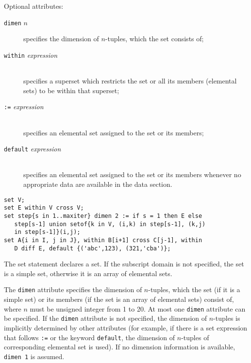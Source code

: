 \documentclass[10pt]{article}
\begin{document}
\noindent Optional attributes:

\begin{description}
\item[{\tt dimen} $n$\hspace*{19pt}] specifies the dimension of
$n$-tuples, which the set consists of;
\item[{\tt within} {\it expression}]\hspace*{0pt}\\
specifies a superset which restricts the set or all its members
(elemental sets) to be within that superset;
\item[{\tt:=} {\it expression}]\hspace*{0pt}\\
specifies an elemental set assigned to the set or its members;
\item[{\tt default} {\it expression}]\hspace*{0pt}\\
specifies an elemental set assigned to the set or its members whenever
no appropriate data are available in the data section.
\end{description}

\newpage


\begin{verbatim}
set V;
set E within V cross V;
set step{s in 1..maxiter} dimen 2 := if s = 1 then E else
   step[s-1] union setof{k in V, (i,k) in step[s-1], (k,j)
   in step[s-1]}(i,j);
set A{i in I, j in J}, within B[i+1] cross C[j-1], within
   D diff E, default {('abc',123), (321,'cba')};
\end{verbatim}

The set statement declares a set. If the subscript domain is not
specified, the set is a simple set, otherwise it is an array of
elemental sets.

The {\tt dimen} attribute specifies the dimension of $n$-tuples, which
the set (if it is a simple set) or its members (if the set is an array
of elemental sets) consist of, where $n$ must be unsigned integer from
1 to 20. At most one {\tt dimen} attribute can be specified. If the
{\tt dimen} attribute is not specified, the dimension of\linebreak
$n$-tuples is implicitly determined by other attributes (for example,
if there is a set expression that follows {\tt:=} or the keyword
{\tt default}, the dimension of $n$-tuples of corresponding elemental
set is used). If no dimension information is available, {\tt dimen 1}
is assumed.
\end{document}
